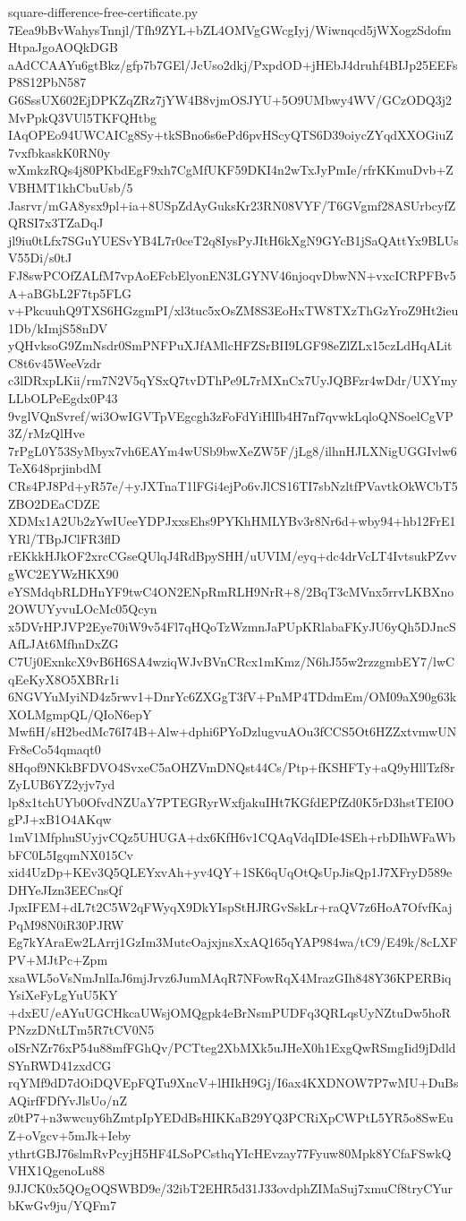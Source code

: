 \documentclass[11pt]{article}
\theoremstyle{definition}
\theoremstyle{remark}
\begin{document}
\begin{filecontents*}[overwrite]{square-difference-free-certificate.py}
7Eea9bBvWahysTnnjl/Tfh9ZYL+bZL4OMVgGWcgIyj/Wiwnqcd5jWXogzSdofmHtpaJgoAOQkDGB
aAdCCAAYu6gtBkz/gfp7b7GEl/JcUso2dkj/PxpdOD+jHEbJ4druhf4BIJp25EEFsP8S12PbN587
G6SssUX602EjDPKZqZRz7jYW4B8vjmOSJYU+5O9UMbwy4WV/GCzODQ3j2MvPpkQ3VUl5TKFQHtbg
IAqOPEo94UWCAICg8Sy+tkSBno6s6ePd6pvHScyQTS6D39oiycZYqdXXOGiuZ7vxfbkaskK0RN0y
wXmkzRQs4j80PKbdEgF9xh7CgMfUKF59DKI4n2wTxJyPmIe/rfrKKmuDvb+ZVBHMT1khCbuUsb/5
Jasrvr/mGA8ysx9pl+ia+8USpZdAyGuksKr23RN08VYF/T6GVgmf28ASUrbcyfZQRSI7x3TZaDqJ
jl9iu0tLfx7SGuYUESvYB4L7r0ceT2q8IysPyJItH6kXgN9GYcB1jSaQAttYx9BLUsV55Di/s0tJ
FJ8swPCOfZALfM7vpAoEFcbElyonEN3LGYNV46njoqvDbwNN+vxcICRPFBv5A+aBGbL2F7tp5FLG
v+PkcuuhQ9TXS6HGzgmPI/xl3tuc5xOsZM8S3EoHxTW8TXzThGzYroZ9Ht2ieu1Db/kImjS58nDV
yQHvksoG9ZmNsdr0SmPNFPuXJfAMlcHFZSrBII9LGF98eZlZLx15czLdHqALitC8t6v45WeeVzdr
c3lDRxpLKii/rm7N2V5qYSxQ7tvDThPe9L7rMXnCx7UyJQBFzr4wDdr/UXYmyLLbOLPeEgdx0P43
9vglVQnSvref/wi3OwIGVTpVEgcgh3zFoFdYiHlIb4H7nf7qvwkLqloQNSoelCgVP3Z/rMzQlHve
7rPgL0Y53SyMbyx7vh6EAYm4wUSb9bwXeZW5F/jLg8/ilhnHJLXNigUGGIvlw6TeX648prjinbdM
CRs4PJ8Pd+yR57e/+yJXTnaT1lFGi4ejPo6vJlCS16TI7sbNzltfPVavtkOkWCbT5ZBO2DEaCDZE
XDMx1A2Ub2zYwIUeeYDPJxxsEhs9PYKhHMLYBv3r8Nr6d+wby94+hb12FrE1YRl/TBpJClFR3flD
rEKkkHJkOF2xrcCGseQUlqJ4RdBpySHH/uUVIM/eyq+dc4drVcLT4IvtsukPZvvgWC2EYWzHKX90
eYSMdqbRLDHnYF9twC4ON2ENpRmRLH9NrR+8/2BqT3cMVnx5rrvLKBXno2OWUYyvuLOcMc05Qcyn
x5DVrHPJVP2Eye70iW9v54Fl7qHQoTzWzmnJaPUpKRlabaFKyJU6yQh5DJncSAfLJAt6MfhnDxZG
C7Uj0ExnkcX9vB6H6SA4wziqWJvBVnCRcx1mKmz/N6hJ55w2rzzgmbEY7/lwCqEeKyX8O5XBRr1i
6NGVYuMyiND4z5rwv1+DnrYc6ZXGgT3fV+PnMP4TDdmEm/OM09aX90g63kXOLMgmpQL/QIoN6epY
MwfiH/sH2bedMc76I74B+Alw+dphi6PYoDzlugvuAOu3fCCS5Ot6HZZxtvmwUNFr8eCo54qmaqt0
8Hqof9NKkBFDVO4SvxeC5aOHZVmDNQst44Cs/Ptp+fKSHFTy+aQ9yHllTzf8rZyLUB6YZ2yjv7yd
lp8x1tchUYb0OfvdNZUaY7PTEGRyrWxfjakuIHt7KGfdEPfZd0K5rD3hstTEI0OgPJ+xB1O4AKqw
1mV1MfphuSUyjvCQz5UHUGA+dx6KfH6v1CQAqVdqIDIe4SEh+rbDIhWFaWbbFC0L5IgqmNX015Cv
xid4UzDp+KEv3Q5QLEYxvAh+yv4QY+1SK6qUqOtQsUpJisQp1J7XFryD589eDHYeJIzn3EECnsQf
JpxIFEM+dL7t2C5W2qFWyqX9DkYIspStHJRGvSskLr+raQV7z6HoA7OfvfKajPqM98N0iR30PJRW
Eg7kYAraEw2LArrj1GzIm3MutcOajxjnsXxAQ165qYAP984wa/tC9/E49k/8cLXFPV+MJtPc+Zpm
xsaWL5oVsNmJnlIaJ6mjJrvz6JumMAqR7NFowRqX4MrazGIh848Y36KPERBiqYsiXeFyLgYuU5KY
+dxEU/eAYuUGCHkcaUWsjOMQgpk4eBrNsmPUDFq3QRLqsUyNZtuDw5hoRPNzzDNtLTm5R7tCV0N5
oISrNZr76xP54u88mfFGhQv/PCTteg2XbMXk5uJHeX0h1ExgQwRSmgIid9jDdldSYnRWD41zxdCG
rqYMf9dD7dOiDQVEpFQTu9XncV+lHIkH9Gj/I6ax4KXDNOW7P7wMU+DuBsAQirfFDfYvJlsUo/nZ
z0tP7+n3wwcuy6hZmtpIpYEDdBsHIKKaB29YQ3PCRiXpCWPtL5YR5o8SwEuZ+oVgcv+5mJk+Ieby
ythrtGBJ76slmRvPcyjH5HF4LSoPCsthqYIcHEvzay77Fyuw80Mpk8YCfaFSwkQVHX1QgenoLu88
9JJCK0x5QOgOQSWBD9e/32ibT2EHR5d31J33ovdphZIMaSuj7xmuCf8tryCYurbKwGv9ju/YQFm7

\end{filecontents*}
\end{document}
